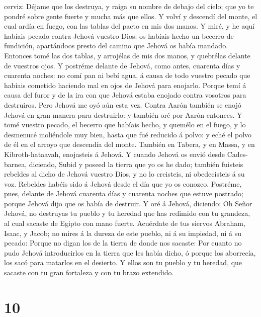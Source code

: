 cerviz:  Déjame que los destruya, y raiga su nombre de
debajo del cielo; que yo te pondré sobre gente fuerte y mucha más que
ellos.  Y volví y descendí del monte, el cual ardía en
fuego, con las tablas del pacto en mis dos manos.  Y miré,
y he aquí habíais pecado contra Jehová vuestro Dios: os habíais hecho un
becerro de fundición, apartándoos presto del camino que Jehová os había
mandado.  Entonces tomé las dos tablas, y arrojélas de mis
dos manos, y quebrélas delante de vuestros ojos.  Y
postréme delante de Jehová, como antes, cuarenta días y cuarenta noches:
no comí pan ni bebí agua, á causa de todo vuestro pecado que habíais
cometido haciendo mal en ojos de Jehová para enojarlo. 
Porque temí á causa del furor y de la ira con que Jehová estaba enojado
contra vosotros para destruiros. Pero Jehová me oyó aún esta vez.
 Contra Aarón también se enojó Jehová en gran manera para
destruirlo: y también oré por Aarón entonces.  Y tomé
vuestro pecado, el becerro que habíais hecho, y quemélo en el fuego, y
lo desmenucé moliéndole muy bien, hasta que fué reducido á polvo: y eché
el polvo de él en el arroyo que descendía del monte. 
También en Tabera, y en Massa, y en Kibroth-hataavah, enojasteis á
Jehová.  Y cuando Jehová os envió desde Cades-barnea,
diciendo, Subid y poseed la tierra que yo os he dado; también fuisteis
rebeldes al dicho de Jehová vuestro Dios, y no lo creisteis, ni
obedecisteis á su voz.  Rebeldes habéis sido á Jehová desde
el día que yo os conozco.  Postréme, pues, delante de
Jehová cuarenta días y cuarenta noches que estuve postrado; porque
Jehová dijo que os había de destruir.  Y oré á Jehová,
diciendo: Oh Señor Jehová, no destruyas tu pueblo y tu heredad que has
redimido con tu grandeza, al cual sacaste de Egipto con mano fuerte.
 Acuérdate de tus siervos Abraham, Isaac, y Jacob; no mires
á la dureza de este pueblo, ni á su impiedad, ni á su pecado:
 Porque no digan los de la tierra de donde nos sacaste: Por
cuanto no pudo Jehová introducirlos en la tierra que les había dicho, ó
porque los aborrecía, los sacó para matarlos en el desierto.
 Y ellos son tu pueblo y tu heredad, que sacaste con tu
gran fortaleza y con tu brazo extendido.

\hypertarget{section-9}{%
\section{10}\label{section-9}}

